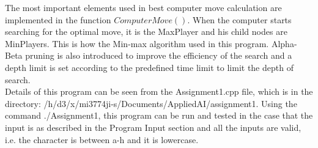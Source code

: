 \documentclass[a4paper, 11pt]{article}
\begin{document}
The most important elements used in best computer move calculation are implemented in the function $ComputerMove()$. When the computer starts searching for the optimal move, it is the MaxPlayer and his child nodes are MinPlayers. This is how the Min-max algorithm used in this program. Alpha-Beta pruning is also introduced to improve the efficiency of the search and a depth limit is set according to the predefined time limit to limit the depth of search. \\

Details of this program can be seen from the Assignment1.cpp file, which is in the directory: /h/d3/x/mi3774ji-s/Documents/AppliedAI/assignment1. Using the command ./Assignment1, this program can be run and tested in the case that the input is as described in the Program Input section and all the inputs are valid, i.e. the character is between a-h and it is lowercase.
\end{document}
